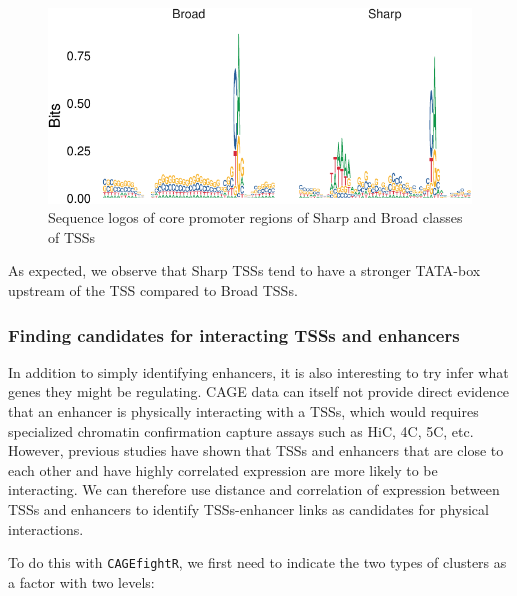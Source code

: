 \documentclass[9pt,a4paper,]{extarticle}
\newenvironment{Shaded}{\begin{snugshade}}{\end{snugshade}}
\newcommand{\KeywordTok}[1]{\textcolor[rgb]{0.13,0.29,0.53}{\textbf{{#1}}}}
\newcommand{\StringTok}[1]{\textcolor[rgb]{0.31,0.60,0.02}{{#1}}}
\newcommand{\NormalTok}[1]{{#1}}
\begin{document}
\begin{figure}

{\centering \includegraphics{CAGEWorkflow_files/figure-latex/ggseqlogo-1} 

}

\caption{Sequence logos of core promoter regions of Sharp and Broad classes of TSSs}\label{fig:ggseqlogo}
\end{figure}

As expected, we observe that Sharp TSSs tend to have a stronger TATA-box upstream of the TSS compared to Broad TSSs.

\subsubsection{Finding candidates for interacting TSSs and enhancers}\label{finding-candidates-for-interacting-tsss-and-enhancers}

In addition to simply identifying enhancers, it is also interesting to try infer what genes they might be regulating. CAGE data can itself not provide direct evidence that an enhancer is physically interacting with a TSSs, which would requires specialized chromatin confirmation capture assays such as HiC, 4C, 5C, etc. However, previous studies have shown that TSSs and enhancers that are close to each other and have highly correlated expression are more likely to be interacting. We can therefore use distance and correlation of expression between TSSs and enhancers to identify TSSs-enhancer links as candidates for physical interactions\citep{Andersson2014b}.

To do this with \texttt{CAGEfightR}, we first need to indicate the two types of clusters as a factor with two levels:

\begin{Shaded}
\end{Shaded}
\end{document}
